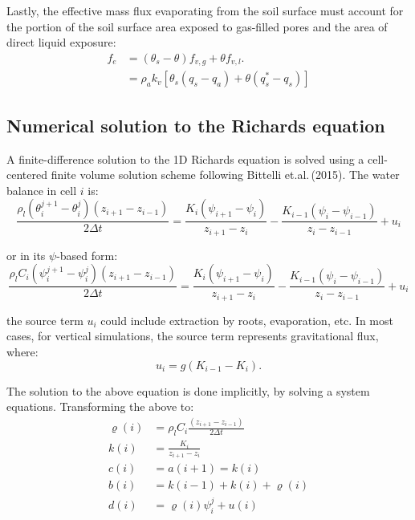 \documentclass[10pt, letterpapr]{article}
\begin{document}
Lastly, the effective mass flux evaporating from the soil surface must account for the portion of the soil surface area exposed to gas-filled pores and the area of direct liquid exposure:
\begin{align*}
	f_e &=\left(\theta_s-\theta\right)f_{v,g}+\theta f_{v,l}. \\
		&=\rho_ak_v\left[\theta_s(q_s-q_a)+\theta(q^*_s-q_s)\right]
\end{align*}




\subsection*{Numerical solution to the Richards equation}

A finite-difference solution to the 1D Richards equation is solved using a cell-centered finite volume solution scheme following Bittelli et.al.\,(2015). The water balance in cell $i$ is:
\[
	\frac{\rho_l\left(\theta_i^{j+1}-\theta_i^j\right)\left(z_{i+1}-z_{i-1}\right)}{2\Delta t}=\frac{K_i\left(\psi_{i+1}-\psi_i\right)}{z_{i+1}-z_i}-\frac{K_{i-1}\left(\psi_i-\psi_{i-1}\right)}{z_i-z_{i-1}}+u_i
\]

\noindent or in its $\psi$-based form:
\[
	\frac{\rho_lC_i\left(\psi_i^{j+1}-\psi_i^j\right)\left(z_{i+1}-z_{i-1}\right)}{2\Delta t}=\frac{K_i\left(\psi_{i+1}-\psi_i\right)}{z_{i+1}-z_i}-\frac{K_{i-1}\left(\psi_i-\psi_{i-1}\right)}{z_i-z_{i-1}}+u_i
\]

\noindent the source term $u_i$ could include extraction by roots, evaporation, etc. In most cases, for vertical simulations, the source term represents gravitational flux, where:
\[
	u_i=g\left(K_{i-1}-K_i\right).
\]

The solution to the above equation is done implicitly, by solving a system equations. Transforming the above to:
\begin{align*}
	\varrho(i) &=\rho_lC_i\frac{\left(z_{i+1}-z_{i-1}\right)}{2\Delta t} \\
	k(i) &=\frac{K_i}{z_{i+1}-z_i} \\
	c(i) &= a(i+1) = k(i) \\
	b(i) &= k(i-1)+k(i)+\varrho(i) \\
	d(i) &= \varrho(i)\psi_i^j+u(i)
\end{align*}
\end{document}

